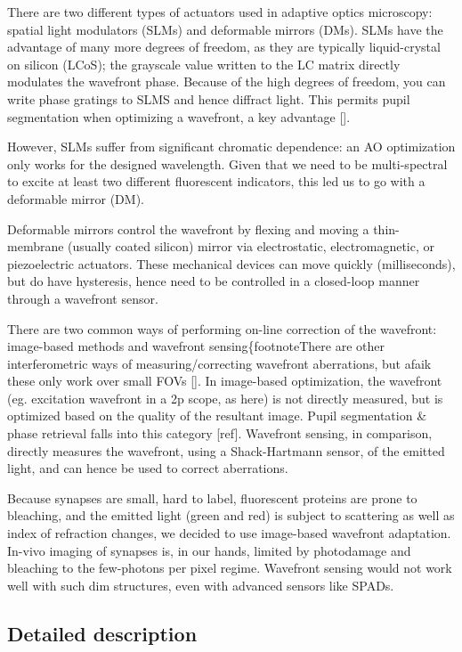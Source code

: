\documentclass[a4paper,12pt]{article}
\begin{document}
There are two different types of actuators used in adaptive optics microscopy: spatial light modulators (SLMs) and deformable mirrors (DMs).  SLMs have the advantage of many more degrees of freedom, as they are typically liquid-crystal on silicon (LCoS); the grayscale value written to the LC matrix directly modulates the wavefront phase.  Because of the high degrees of freedom, you can write phase gratings to SLMS and hence diffract light.  This permits pupil segmentation when optimizing a wavefront, a key advantage [].  

However, SLMs suffer from significant chromatic dependence: an AO optimization only works for the designed wavelength.  Given that we need to be multi-spectral to excite at least two different fluorescent indicators, this led us to go with a deformable mirror (DM). 

Deformable mirrors control the wavefront by flexing and moving a thin-membrane (usually coated silicon) mirror via electrostatic, electromagnetic, or piezoelectric actuators.  These mechanical devices can move quickly (milliseconds), but do have hysteresis, hence need to be controlled in a closed-loop manner through a wavefront sensor.  

There are two common ways of performing on-line correction of the wavefront: image-based methods and wavefront sensing\{footnote{There are other interferometric ways of measuring/correcting wavefront aberrations, but afaik these only work over small FOVs []}.  In image-based optimization, the wavefront (eg. excitation wavefront in a 2p scope, as here) is not directly measured, but is optimized based on the quality of the resultant image.  Pupil segmentation \& phase retrieval falls into this category [ref].  Wavefront sensing, in comparison, directly measures the wavefront, using a Shack-Hartmann sensor, of the emitted light, and can hence be used to correct aberrations.  

Because synapses are small, hard to label, fluorescent proteins are prone to bleaching, and the emitted light (green and red) is subject to scattering as well as index of refraction changes, we decided to use image-based wavefront adaptation.  In-vivo imaging of synapses is, in our hands, limited by photodamage and bleaching to the few-photons per pixel regime.  Wavefront sensing would not work well with such dim structures, even with advanced sensors like SPADs.  

\subsection{Detailed description}
\end{document}

